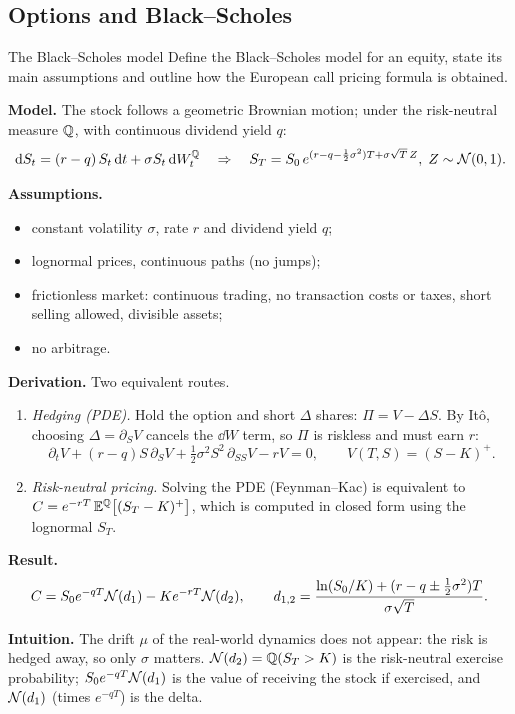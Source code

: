 \subsection{Options and Black--Scholes}

\begin{question}{\Theory {}}{The Black--Scholes model}
Define the Black--Scholes model for an equity, state its main assumptions and
outline how the European call pricing formula is obtained.
\end{question}
\begin{answer}
\textbf{Model.} The stock follows a geometric Brownian motion; under the
risk-neutral measure $\mathbb{Q}$, with continuous dividend yield $q$:
\[
  \,\mathrm{d} S_t = (r - q)\,S_t \,\mathrm{d} t + \sigma S_t \,\mathrm{d} W_t^{\mathbb{Q}}
  \quad\Rightarrow\quad
  S_T = S_0\, e^{(r - q - \frac{1}{2}\sigma^2)T + \sigma\sqrt{T}\,Z},\; Z\sim\mathcal{N}(0,1).
\]

\textbf{Assumptions.}
\begin{itemize}[nosep]
  \item constant volatility $\sigma$, rate $r$ and dividend yield $q$;
  \item lognormal prices, continuous paths (no jumps);
  \item frictionless market: continuous trading, no transaction costs or
        taxes, short selling allowed, divisible assets;
  \item no arbitrage.
\end{itemize}

\textbf{Derivation.} Two equivalent routes.
\begin{enumerate}[nosep]
  \item \emph{Hedging (PDE).} Hold the option and short $\Delta$ shares:
        $\Pi = V - \Delta S$. By It\^o, choosing $\Delta = \partial_S V$
        cancels the $\dd W$ term, so $\Pi$ is riskless and must earn $r$:
        \[
          \partial_t V + (r - q) S\,\partial_S V
          + \tfrac{1}{2}\sigma^2 S^2\,\partial_{SS} V - rV = 0,
          \qquad V(T,S) = (S - K)^+ .
        \]
  \item \emph{Risk-neutral pricing.} Solving the PDE (Feynman--Kac) is
        equivalent to
        $C = e^{-rT}\,\mathbb{E}^{\mathbb{Q}}\big[(S_T - K)^+\big]$, which is computed
        in closed form using the lognormal $S_T$.
\end{enumerate}

\textbf{Result.}
\[
  C = S_0 e^{-qT} \mathcal{N}(d_1) - K e^{-rT} \mathcal{N}(d_2),
  \qquad
  d_{1,2} = \frac{\ln(S_0/K) + (r - q \pm \frac{1}{2}\sigma^2)T}{\sigma\sqrt{T}} .
\]

\textbf{Intuition.} The drift $\mu$ of the real-world dynamics does not appear:
the risk is hedged away, so only $\sigma$ matters.
$\mathcal{N}(d_2) = \mathbb{Q}(S_T > K)$ is the risk-neutral exercise probability;
$S_0 e^{-qT}\mathcal{N}(d_1)$ is the value of receiving the stock if exercised, and
$\mathcal{N}(d_1)$ (times $e^{-qT}$) is the delta.
\end{answer}


